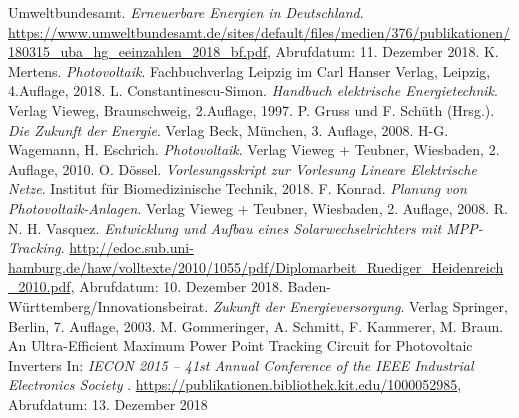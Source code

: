 \begin{thebibliography}{99}

	 Umweltbundesamt. {\itshape Erneuerbare Energien in Deutschland}. \url{https://www.umweltbundesamt.de/sites/default/files/medien/376/publikationen/180315_uba_hg_eeinzahlen_2018_bf.pdf}, Abrufdatum: 11. Dezember 2018.	%
	 K. Mertens. {\itshape Photovoltaik}. Fachbuchverlag Leipzig im Carl Hanser Verlag, Leipzig, 4.Auflage, 2018. %
	 L. Constantinescu-Simon. {\itshape 	
	Handbuch elektrische Energietechnik}. Verlag Vieweg, Braunschweig, 2.Auflage, 1997. %
	 P. Gruss und F. Schüth (Hrsg.). {\itshape Die Zukunft der Energie}. Verlag Beck, München, 3. Auflage, 2008.	%
	 H-G. Wagemann, H. Eschrich. {\itshape Photovoltaik}. Verlag Vieweg + Teubner, Wiesbaden, 2. Auflage, 2010. %
	 O. Dössel. {\itshape Vorlesungsskript zur Vorlesung Lineare Elektrische Netze}. Institut für Biomedizinische Technik, 2018.
	 F. Konrad. {\itshape Planung von Photovoltaik-Anlagen}. Verlag Vieweg + Teubner, Wiesbaden, 2. Auflage, 2008. %
	 R. N. H. Vasquez. {\itshape Entwicklung und Aufbau eines Solarwechselrichters mit MPP-Tracking}. \url{http://edoc.sub.uni-hamburg.de/haw/volltexte/2010/1055/pdf/Diplomarbeit_Ruediger_Heidenreich_2010.pdf}, Abrufdatum: 10. Dezember 2018. %
	 Baden-Württemberg/Innovationsbeirat. {\itshape Zukunft der Energieversorgung}. Verlag Springer, Berlin, 7. Auflage, 2003. %
	 M. Gommeringer, A. Schmitt, F. Kammerer, M. Braun. An Ultra-Efficient Maximum Power Point Tracking Circuit for Photovoltaic Inverters In: {\itshape IECON 2015 – 41st Annual Conference of the IEEE Industrial Electronics Society }. \url{https://publikationen.bibliothek.kit.edu/1000052985}, Abrufdatum: 13. Dezember 2018 %

	
\end{thebibliography}
